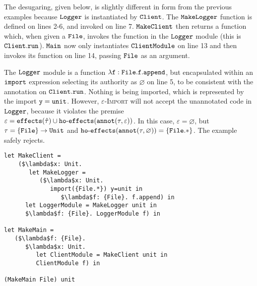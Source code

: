 The desugaring, given below, is slightly different in form from the previous examples because $\mathtt{Logger}$ is instantiated by $\mathtt{Client}$. The $\mathtt{MakeLogger}$ function is defined on lines 2-6, and invoked on line 7. $\mathtt{MakeClient}$ then returns a function which, when given a $\mathtt{File}$, invokes the function in the $\mathtt{Logger}$ module (this is $\mathtt{Client.run}$). $\mathtt{Main}$ now only instantiates $\mathtt{ClientModule}$ on line 13 and then invokes its function on line 14, passing $\mathtt{File}$ as an argument.

The $\mathtt{Logger}$ module is a function $\mathtt{\lambda f: {File}. f.append}$, but encapsulated within an $\mathtt{import}$ expression selecting its authority as $\varnothing$ on line 5, to be consistent with the annotation on $\mathtt{Client.run}$. Nothing is being imported, which is represented by the import $\mathtt{y = unit}$. However, \textsc{$\varepsilon$-Import} will not accept the unannotated code in $\mathtt{Logger}$, because it violates the premise $\varepsilon = \mathtt{effects}(\hat \tau) \cup \mathtt{ho \hbox{-} effects}(\mathtt{annot}(\tau, \varepsilon))$. In this case, $\varepsilon = \varnothing$, but $\tau = \mathtt{ \{ File \} \rightarrow Unit}$ and $\mathtt{ho \hbox{-} effects}(\mathtt{annot}(\tau, \varnothing)) = \{ \mathtt{File.*} \}$. The example safely rejects.

\begin{lstlisting}
let MakeClient =
	($\lambda$x: Unit.
	   let MakeLogger =
	      ($\lambda$x: Unit.
	         import({File.*}) y=unit in
	            $\lambda$f: {File}. f.append) in
      let LoggerModule = MakeLogger unit in
      $\lambda$f: {File}. LoggerModule f) in

let MakeMain =
   ($\lambda$f: {File}.
      $\lambda$x: Unit.
         let ClientModule = MakeClient unit in
         ClientModule f) in

(MakeMain File) unit
\end{lstlisting}

